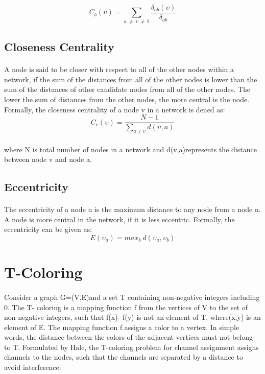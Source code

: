 \[
C_{b}(\upsilon) = \sum_{ a \ \neq \  \upsilon \ \neq \ b} \frac{\delta_{ab}(\upsilon)}{\delta_{ab}}
\] 

\subsection{Closeness Centrality}
\paragraph{}
A node is said to be closer with respect to all of the other nodes within a network, if
the sum of the distances from all of the other nodes is lower than the sum of the distances
of other candidate nodes from all of the other nodes. The lower the sum of distances from
the other nodes, the more central is the node. Formally, the closeness centrality of a node
v in a network is dened as:
\linebreak
\[
C_{c}(\upsilon) = \frac{N - 1}{ \sum _{ a \neq \upsilon} d(\upsilon, a)}
\]

\paragraph{}
where N is total number of nodes in a network and d(v,a)represents the distance between
node v and node a.
\subsection{Eccentricity}
\paragraph{}
The eccentricity of a node n is the maximum distance to any node from a node n. A
node is more central in the network, if it is less eccentric. Formally, the eccentricity can be
given as:
$$ E(\upsilon_{a}) = max _{b} \ d(\upsilon_{a},\upsilon_{b}) $$
\section{T-Coloring}
\paragraph{}
Consider a graph G=(V,E)and a set T containing non-negative integers including 0.
The T- coloring is a mapping function f from the vertices of V to the set of non-negative
integers, such that f(x)- f(y) is not an element of T, where(x,y) is an element of E. The
mapping function f assigns a color to a vertex. In simple words, the distance between the
colors of the adjacent vertices must not belong to T. Formulated by Hale, the T-coloring
problem for channel assignment assigns channels to the nodes, such that the channels are
separated by a distance to avoid interference.

